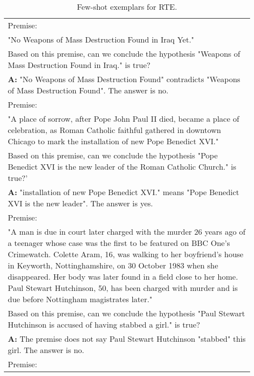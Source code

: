 \begin{table}[h]
    \caption{
    Few-shot exemplars for RTE.
    }
    \centering
    \small
    \begin{tabular}{p{14cm}}
        \toprule
        Premise:\\
        "No Weapons of Mass Destruction Found in Iraq Yet."\\
        Based on this premise, can we conclude the hypothesis "Weapons of Mass Destruction Found in Iraq." is true?\\
        \vspace{-1mm}
        \textbf{A:} "No Weapons of Mass Destruction Found" contradicts "Weapons of Mass Destruction Found". The answer is no.\\
        \vspace{0mm}
        Premise:\\
        "A place of sorrow, after Pope John Paul II died, became a place of celebration, as Roman Catholic faithful gathered in downtown Chicago to mark the installation of new Pope Benedict XVI."\\
        Based on this premise, can we conclude the hypothesis "Pope Benedict XVI is the new leader of the Roman Catholic Church." is true?'\\
        \vspace{-1mm}
        \textbf{A:} "installation of new Pope Benedict XVI." means "Pope Benedict XVI is the new leader". The answer is yes. \\
        \vspace{0mm}
        Premise:\\
        "A man is due in court later charged with the murder 26 years ago of a teenager whose case was the first to be featured on BBC One's Crimewatch. Colette Aram, 16, was walking to her boyfriend's house in Keyworth, Nottinghamshire, on 30 October 1983 when she disappeared. Her body was later found in a field close to her home. Paul Stewart Hutchinson, 50, has been charged with murder and is due before Nottingham magistrates later."\\
        Based on this premise, can we conclude the hypothesis "Paul Stewart Hutchinson is accused of having stabbed a girl." is true?\\
        \vspace{-1mm}
        \textbf{A:} The premise does not say Paul Stewart Hutchinson "stabbed" this girl. The answer is no.\\
        \vspace{0mm}
        Premise:\\

\end{tabular}
\end{table}
